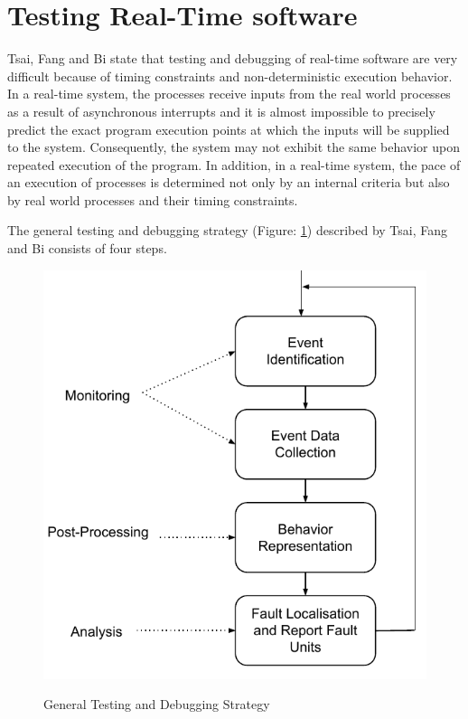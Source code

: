 

\section{Testing Real-Time software}
Tsai, Fang and Bi\cite{rtSandD} state that testing and debugging of real-time software are very difficult because of timing constraints and non-deterministic execution behavior. In a real-time system, the processes receive inputs from the real world processes as a result of asynchronous interrupts and it is almost impossible to precisely predict the exact program execution points at which the inputs will be supplied to the system. Consequently, the system may not exhibit the same behavior upon repeated execution of the program. In addition, in a real-time system, the pace of an execution of processes is determined not only by an internal criteria but also by real world processes and their timing constraints. 

The general testing and debugging strategy (Figure: \ref{fig:GeneralTestingAndDebugging}) described by Tsai, Fang and Bi \cite{rtSandD} consists of four steps.
\begin{figure}[ht]
	\centering
	\includegraphics[width=0.7\linewidth]{grafiken/GeneralTestingAndDebugging}
	\label{fig:GeneralTestingAndDebugging}
	\caption{General Testing and Debugging Strategy\cite{rtSandD}}
\end{figure}

